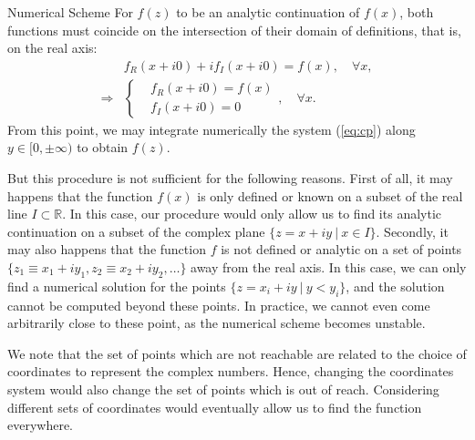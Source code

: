 \begin{section}{Numerical Scheme}
  For $f(z)$ to be an analytic continuation of $f(x)$, both functions
  must coincide on the intersection of their domain of definitions,
  that is, on the real axis:
  \begin{align}
    &f_R(x+i0)+if_I(x+i0) = f(x),\quad \forall x,\\
    \Rightarrow 
    &\left\{
    \begin{aligned}
      &f_R(x+i0) = f(x)\\
      &f_I(x+i0) = 0
    \end{aligned}
    \right.,\quad \forall x.
  \end{align}  
  From this point, we may integrate numerically the system
  (\ref{eq:cp}) along $y\in [0,\pm\infty)$ to obtain $f(z)$.
    
  But this procedure is not sufficient for the following
  reasons. First of all, it may happens that the function $f(x)$ is
  only defined or known on a subset of the real line $I\subset
  \mathbb{R}$. In this case, our procedure would only allow us to find
  its analytic continuation on a subset of the complex plane
  $\{z=x+iy\ |\ x\in I\}$. Secondly, it may also happens that the
  function $f$ is not defined or analytic on a set of points $\{z_1
  \equiv x_1+iy_1, z_2 \equiv x_2+iy_2, \dots\}$ away from the real
  axis. In this case, we can only find a numerical solution for the
  points $\{z=x_i+iy\ |\ y<y_i\}$, and the solution cannot be computed
  beyond these points.
  In practice, we cannot even come arbitrarily close to these
  point, as the numerical scheme becomes unstable.

  We note that the set of points which are not reachable are related
  to the choice of coordinates to represent the complex
  numbers. Hence, changing the coordinates system would also change
  the set of points which is out of reach. Considering different sets
  of coordinates would eventually allow us to find the function
  everywhere.
    

\end{section}
